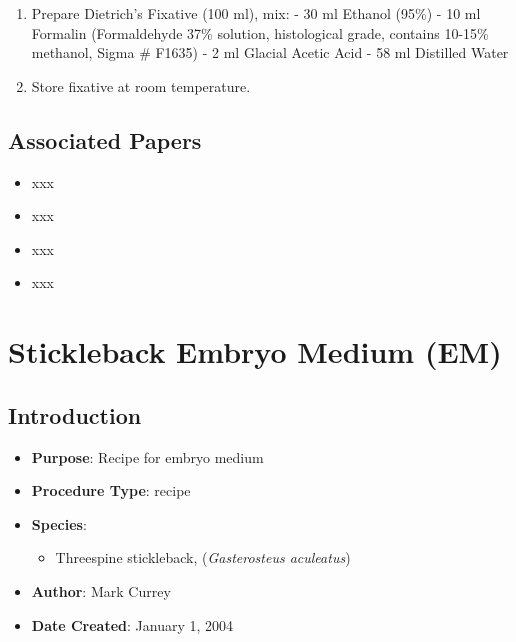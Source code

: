 \documentclass[
  letterpaper,
  DIV=11,
  numbers=noendperiod]{scrreprt}
\providecommand{\tightlist}{%
  \setlength{\itemsep}{0pt}\setlength{\parskip}{0pt}}\usepackage{longtable,booktabs,array}
\begin{document}
\begin{enumerate}
\def\labelenumi{\arabic{enumi}.}
\tightlist
\item
  Prepare Dietrich's Fixative (100 ml), mix: - 30 ml Ethanol (95\%) - 10
  ml Formalin (Formaldehyde 37\% solution, histological grade, contains
  10-15\% methanol, Sigma \# F1635) - 2 ml Glacial Acetic Acid - 58 ml
  Distilled Water
\item
  Store fixative at room temperature.
\end{enumerate}

\hypertarget{associated-papers-61}{%
\section{Associated Papers}\label{associated-papers-61}}

\begin{itemize}
\tightlist
\item
  xxx
\item
  xxx
\item
  xxx
\item
  xxx
\end{itemize}

\hypertarget{sec-recipe-em}{%
\chapter{Stickleback Embryo Medium (EM)}\label{sec-recipe-em}}

\hypertarget{introduction-93}{%
\section{Introduction}\label{introduction-93}}

\begin{itemize}
\tightlist
\item
  \textbf{Purpose}: Recipe for embryo medium\\
\item
  \textbf{Procedure Type}: recipe
\item
  \textbf{Species}:

  \begin{itemize}
  \tightlist
  \item
    Threespine stickleback, (\emph{Gasterosteus aculeatus})
  \end{itemize}
\item
  \textbf{Author}: Mark Currey
\item
  \textbf{Date Created}: January 1, 2004
\end{itemize}
\end{document}
